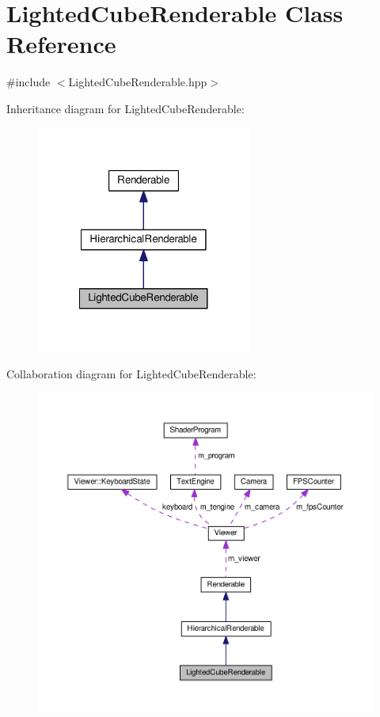 \hypertarget{classLightedCubeRenderable}{\section{Lighted\+Cube\+Renderable Class Reference}
\label{classLightedCubeRenderable}
}


{\ttfamily \#include $<$Lighted\+Cube\+Renderable.\+hpp$>$}



Inheritance diagram for Lighted\+Cube\+Renderable\+:\nopagebreak
\begin{figure}[H]
\begin{center}
\leavevmode
\includegraphics[width=200pt]{classLightedCubeRenderable__inherit__graph}
\end{center}
\end{figure}


Collaboration diagram for Lighted\+Cube\+Renderable\+:\nopagebreak
\begin{figure}[H]
\begin{center}
\leavevmode
\includegraphics[width=350pt]{classLightedCubeRenderable__coll__graph}
\end{center}
\end{figure}
